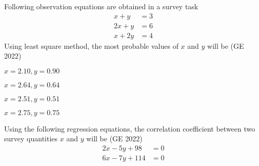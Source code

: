 \item Following observation equations are obtained in a survey task
\begin{align*}
x + y &= 3 \\
2x + y &= 6 \\
x + 2y &= 4
\end{align*}
Using least square method, the most probable values of $x$ and $y$ will be
\hfill (GE 2022)
\begin{enumerate}
\begin{multicols}{4}
    \item $x = 2.10, y = 0.90$
    \item $x = 2.64, y = 0.64$
    \item $x = 2.51, y = 0.51$
    \item $x = 2.75, y = 0.75$
\end{multicols}
\end{enumerate}
\item Using the following regression equations, the correlation coefficient between two survey quantities $x$ and $y$ will be \makebox[1cm]{\hrulefill} 
\hfill (GE 2022)
\begin{align*}
2x - 5y + 98 &= 0 \\
6x - 7y + 114 &= 0
\end{align*}
